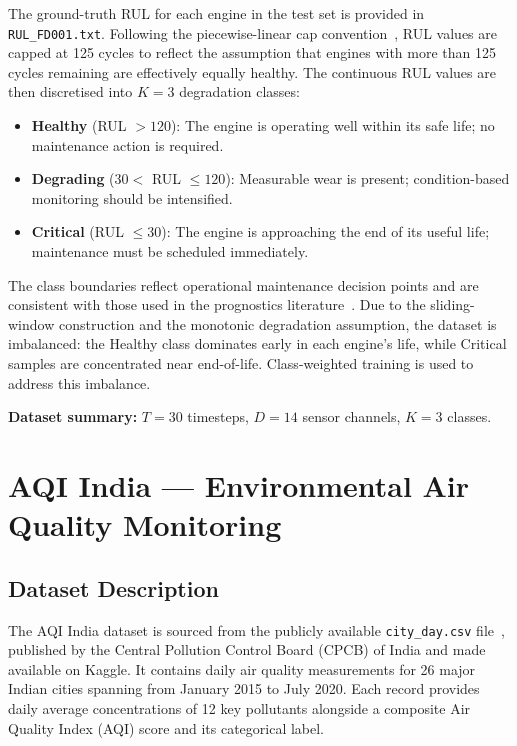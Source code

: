 The ground-truth RUL for each engine in the test set is provided in \texttt{RUL\_FD001.txt}. Following the piecewise-linear cap convention~\cite{heimes2008recurrent}, RUL values are capped at 125 cycles to reflect the assumption that engines with more than 125 cycles remaining are effectively equally healthy. The continuous RUL values are then discretised into $K = 3$ degradation classes:

\begin{itemize}
    \item \textbf{Healthy} (RUL $> 120$): The engine is operating well within its safe life; no maintenance action is required.
    \item \textbf{Degrading} ($30 <$ RUL $\leq 120$): Measurable wear is present; condition-based monitoring should be intensified.
    \item \textbf{Critical} (RUL $\leq 30$): The engine is approaching the end of its useful life; maintenance must be scheduled immediately.
\end{itemize}

The class boundaries reflect operational maintenance decision points and are consistent with those used in the prognostics literature~\cite{li2018remaining}. Due to the sliding-window construction and the monotonic degradation assumption, the dataset is imbalanced: the Healthy class dominates early in each engine's life, while Critical samples are concentrated near end-of-life. Class-weighted training is used to address this imbalance.

\textbf{Dataset summary:} $T = 30$ timesteps, $D = 14$ sensor channels, $K = 3$ classes.

\section{AQI India — Environmental Air Quality Monitoring}

\subsection{Dataset Description}

The AQI India dataset is sourced from the publicly available \texttt{city\_day.csv} file~\cite{cpcb2020aqi}, published by the Central Pollution Control Board (CPCB) of India and made available on Kaggle. It contains daily air quality measurements for 26 major Indian cities spanning from January 2015 to July 2020. Each record provides daily average concentrations of 12 key pollutants alongside a composite Air Quality Index (AQI) score and its categorical label.

